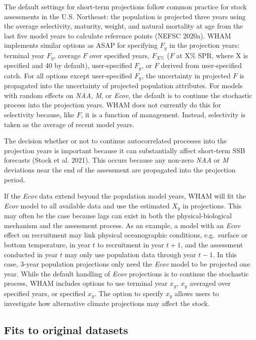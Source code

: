 \documentclass[]{article}
\begin{document}
The default settings for short-term projections follow common practice
for stock assessments in the U.S. Northeast: the population is projected
three years using the average selectivity, maturity, weight, and natural
mortality at age from the last five model years to calculate reference
points (NEFSC 2020a). WHAM implements similar options as ASAP for
specifying \(F_y\) in the projection years: terminal year \(F_y\),
average \(F\) over specified years, \(F_{X\%}\) (\(F\) at X\% SPR, where
X is specified and 40 by default), user-specified \(F_y\), or \(F\)
derived from user-specified catch. For all options except user-specified
\(F_y\), the uncertainty in projected \(F\) is propagated into the
uncertainty of projected population attributes. For models with random
effects on \emph{NAA}, \emph{M}, or \emph{Ecov}, the default is to
continue the stochastic process into the projection years. WHAM does not
currently do this for selectivity because, like \(F\), it is a function
of management. Instead, selectivity is taken as the average of recent
model years.

The decision whether or not to continue autocorrelated processes into
the projection years is important because it can substantially affect
short-term SSB forecasts (Stock et al. 2021). This occurs because any
non-zero \emph{NAA} or \emph{M} deviations near the end of the
assessment are propagated into the projection period.

If the \emph{Ecov} data extend beyond the population model years, WHAM
will fit the \emph{Ecov} model to all available data and use the
estimated \(X_y\) in projections. This may often be the case because
lags can exist in both the physical-biological mechanism and the
assessment process. As an example, a model with an \emph{Ecov} effect on
recruitment may link physical oceanographic conditions, e.g.~surface or
bottom temperature, in year \(t\) to recruitment in year \(t+1\), and
the assessment conducted in year \(t\) may only use population data
through year \(t-1\). In this case, 3-year population projections only
need the \emph{Ecov} model to be projected one year. While the default
handling of \emph{Ecov} projections is to continue the stochastic
process, WHAM includes options to use terminal year \(x_y\), \(x_y\)
averaged over specified years, or specified \(x_y\). The option to
specify \(x_y\) allows users to investigate how alternative climate
projections may affect the stock.

\hypertarget{fits-to-original-datasets}{%
\subsection{Fits to original datasets}\label{fits-to-original-datasets}}
\end{document}
